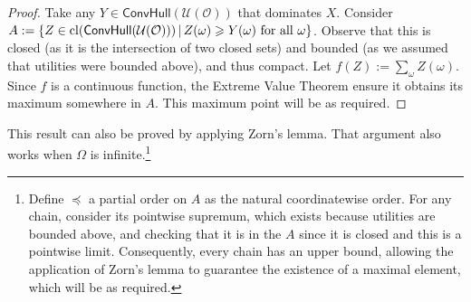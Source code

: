 \documentclass[a4paper]{article}
\newcommand\cl{\mathrm{cl}}
\renewcommand\O{\mathcal{O}}
\newcommand\Uwald{\mathcal{U}} %
\newcommand{\Conv}{\mathsf{ConvHull}}
\newcommand\SetDelimiter[1][]{
	\nonscript\,#1\vert \allowbreak \nonscript\,\mathopen{}}
\providecommand\given{\SetDelimiter}
\renewcommand{\geq}{\geqslant}
\newenvironment{CCM rewritten}
{\begingroup\color{blue}} %
{\endgroup}              %
\begin{document}
	
	\begin{proof}
		Take any $Y\in \Conv(\Uwald(\O))$ that dominates $X$. Consider $A:=\{Z\in \cl(\Conv(\Uwald(\O)))\given  Z(\omega)\geq Y(\omega)\text{ for all $\omega$}\}$. Observe that this is closed (as it is the intersection of two closed sets) and bounded (as we assumed that utilities were bounded above), and thus compact. Let $f(Z):=\sum_\omega Z(\omega)$. Since $f$ is a continuous function, the Extreme Value Theorem ensure it obtains its maximum somewhere in $A$. This maximum point will be as required. 
	\end{proof}
	
	This result can also be proved by applying Zorn's lemma. That argument also works when $\Omega$ is infinite.\footnote{Define $\preccurlyeq$ a partial order on $A$ as the natural coordinatewise order. For any chain, consider its pointwise supremum, which exists because utilities are bounded above, and checking that it is in the $A$ since it is closed and this is a pointwise limit. Consequently, every chain has an upper bound, allowing the application of Zorn's lemma to guarantee the existence of a maximal element, which will be as required. } 
	
\end{document}
